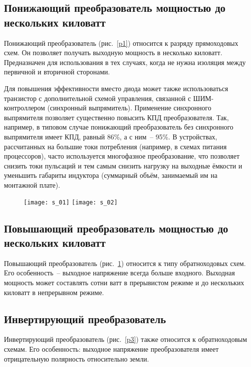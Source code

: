 \subsection{Понижающий преобразователь мощностью до нескольких киловатт}

Понижающий преобразователь (рис.~\ref{p1}) относится к разряду прямоходовых
схем. Он позволяет получать выходную мощность в несколько киловатт. Предназначен
для использования в тех случаях, когда не нужна изоляция между первичной и
вторичной сторонами.

Для повышения эффективности вместо диода может также использоваться транзистор с
дополнительной схемой управления, связанной с ШИМ-контроллером (синхронный
выпрямитель). Применение синхронного выпрямителя позволяет существенно повысить
КПД преобразователя. Так, например, в типовом случае понижающий преобразователь
без синхронного выпрямителя имеет КПД, равный 86\%, а с ним~-- 95\%. В
устройствах, рассчитанных на большие токи потребления (например, в схемах
питания процессоров), часто используется многофазное преобразование, что
позволяет снизить токи пульсаций и тем самым снизить нагрузку на выходные
ёмкости и уменьшить габариты индуктора (суммарный объём, занимаемый им на
монтажной плате).

\begin{figure}[ht]
	\texttt{[image: s\_01]} \hfill
	\texttt{[image: s\_02]}
	\parbox{.45\textwidth}{\caption{}\label{p1}} \hfill
	\parbox{.45\textwidth}{\caption{}\label{p2}}
\end{figure}

\subsection{Повышающий преобразователь мощностью до нескольких киловатт}

Повышающий преобразователь (рис.~\ref{p2}) относится к типу обратноходовых схем.
Его особенность~-- выходное напряжение всегда больше входного. Выходная мощность
может составлять сотни ватт в прерывистом режиме и до нескольких киловатт в
непрерывном режиме.

\subsection{Инвертирующий преобразователь}

Инвертирующий преобразователь (рис.~\ref{p3}) также относится к обратноходовым
схемам. Его особенность: выходное напряжение преобразователя имеет отрицательную
полярность относительно земли.
	 
